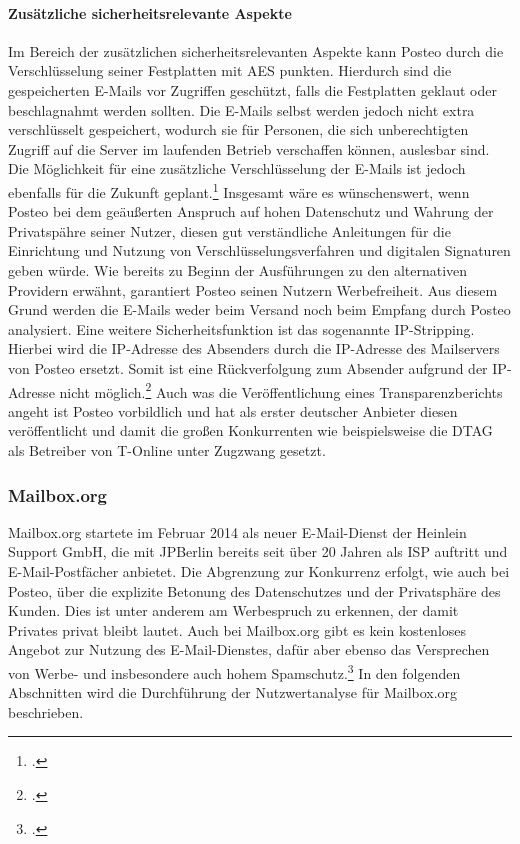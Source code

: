 \documentclass  [paper=a4,
				fontsize=12pt,
				listof=totoc,
				bibliography=totoc
				]{scrreprt}
\begin{document}
					\paragraph{Zusätzliche sicherheitsrelevante Aspekte}
						Im Bereich der zusätzlichen sicherheitsrelevanten Aspekte kann Posteo durch die Verschlüsselung seiner Festplatten mit \ac{AES} punkten.
						Hierdurch sind die gespeicherten E-Mails vor Zugriffen geschützt, falls die Festplatten geklaut oder beschlagnahmt werden sollten.
						Die E-Mails selbst werden jedoch nicht extra verschlüsselt gespeichert, wodurch sie für Personen, die sich unberechtigten Zugriff auf die Server im laufenden Betrieb verschaffen können, auslesbar sind.
						Die Möglichkeit für eine zusätzliche Verschlüsselung der E-Mails ist jedoch ebenfalls für die Zukunft geplant.\footcite[Vgl.][]{Posteo2013c}
						Insgesamt wäre es wünschenswert, wenn Posteo bei dem geäußerten Anspruch auf hohen Datenschutz und Wahrung der Privatspähre seiner Nutzer, diesen gut verständliche Anleitungen für die Einrichtung und Nutzung von Verschlüsselungsverfahren und digitalen Signaturen geben würde.
						Wie bereits zu Beginn der Ausführungen zu den alternativen Providern erwähnt, garantiert Posteo seinen Nutzern Werbefreiheit.
						Aus diesem Grund werden die E-Mails weder beim Versand noch beim Empfang durch Posteo analysiert.
						Eine weitere Sicherheitsfunktion ist das sogenannte \ac{IP}-Stripping.
						Hierbei wird die \ac{IP}-Adresse des Absenders durch die \ac{IP}-Adresse des Mailservers von Posteo ersetzt.
						Somit ist eine Rückverfolgung zum Absender aufgrund der \ac{IP}-Adresse nicht möglich.\footcite[Vgl.][]{Posteo2013a}
						Auch was die Veröffentlichung eines Transparenzberichts angeht ist Posteo vorbildlich und hat als erster deutscher Anbieter diesen veröffentlicht und damit die großen Konkurrenten wie beispielsweise die \ac{DTAG} als Betreiber von T-Online unter Zugzwang gesetzt.
					
					
				\subsubsection{Mailbox.org}
				\label{subsubsec:mailbox}
					Mailbox.org startete im Februar 2014 als neuer E-Mail-Dienst der Heinlein Support GmbH, die mit JPBerlin bereits seit über 20 Jahren als \ac{ISP} auftritt und E-Mail-Postfächer anbietet.
					Die Abgrenzung zur Konkurrenz erfolgt, wie auch bei Posteo, über die explizite Betonung des Datenschutzes und der Privatsphäre des Kunden.
					Dies ist unter anderem am Werbespruch zu erkennen, der \glqq damit Privates privat bleibt\grqq{} lautet.
					Auch bei Mailbox.org gibt es kein kostenloses Angebot zur Nutzung des E-Mail-Dienstes, dafür aber ebenso das Versprechen von Werbe- und insbesondere auch hohem Spamschutz.\footcite[Vgl.][]{Mailbox2014}
					In den folgenden Abschnitten wird die Durchführung der Nutzwertanalyse für Mailbox.org beschrieben.
					
\end{document}
